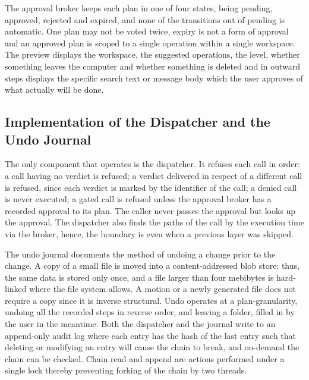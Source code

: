 \documentclass{FastFyp}
\begin{document}
The approval broker keeps each plan in one of four states, being pending, approved, rejected and expired, and none of the transitions out of pending is automatic. One plan may not be voted twice, expiry is not a form of approval and an approved plan is scoped to a single operation within a single workspace. The preview displays the workspace, the suggested operations, the level, whether something leaves the computer and whether something is deleted and in outward steps displays the specific search text or message body which the user approves of what actually will be done.

\subsection{Implementation of the Dispatcher and the Undo Journal}
The only component that operates is the dispatcher. It refuses each call in order: a call having no verdict is refused; a verdict delivered in respect of a different call is refused, since each verdict is marked by the identifier of the call; a denied call is never executed; a gated call is refused unless the approval broker has a recorded approval to its plan. The caller never passes the approval but looks up the approval. The dispatcher also finds the paths of the call by the execution time via the broker, hence, the boundary is even when a previous layer was skipped.

The undo journal documents the method of undoing a change prior to the change. A copy of a small file is moved into a content-addressed blob store: thus, the same data is stored only once, and a file larger than four mebibytes is hard-linked where the file system allows. A motion or a newly generated file does not require a copy since it is inverse structural. Undo operates at a plan-granularity, undoing all the recorded steps in reverse order, and leaving a folder, filled in by the user in the meantime. Both the dispatcher and the journal write to an append-only audit log where each entry has the hash of the last entry such that deleting or modifying an entry will cause the chain to break, and on-demand the chain can be checked. Chain read and append are actions performed under a single lock thereby preventing forking of the chain by two threads.
\end{document}
